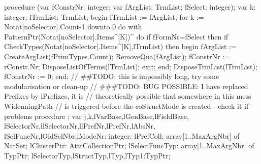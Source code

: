 \nwenddocs{}\endmoddef\nwstartdeflinemarkup{}\nwenddeflinemarkup
procedure (var fConstrNr: integer;
                          var fArgList: TrmList;
                          fSelect: integer);
var
   k: integer;
   lTrmList: TrmList;
begin
   lTrmList := fArgList;
   for k := Notat[noSelector].Count-1 downto 0 do
      with PatternPtr(Notat[noSelector].Items^[K])^ do
         if fFormNr=fSelect then
            if CheckTypes(Notat[noSelector].Items^[K],lTrmList) then
            begin
               fArgList := CreateArgList(fPrimTypes.Count);
               RemoveQua(fArgList);
               fConstrNr := rConstr.Nr;
               DisposeListOfTerms(lTrmList);
               exit;
            end;
   DisposeTrmList(lTrmList);
   fConstrNr := 0;
end;
\eatline
{}\nwendcode{}\nwdocspar
\nwenddocs{}\endmoddef\nwstartdeflinemarkup{}\nwenddeflinemarkup
// ##TODO: this is impossibly long, try some modularisation or clean-up
// ###TODO: BUG POSSIBLE: I have replaced Prefixes by lPrefixes, it is
//          theoretically possible that somewhere in this mess WidenningPath
//          is triggered before the coStructMode is created - check it if problems
procedure ;
var
   j,k,lVarBase,lGenBase,lFieldBase,
   lSelectorNr,llSelectorNr,llPrefNr,lPrefNr,lAbsNr,
   lSelFuncNr,lOldSelNbr,lModeNr: integer;
   lPrefColl: array[1..MaxArgNbr] of NatSet;
   lClusterPtr: AttrCollectionPtr;
   lSelectFuncTyp: array[1..MaxArgNbr] of TypPtr;
   lSelectorTyp,lStructTyp,lTyp,lTyp1:TypPtr;
